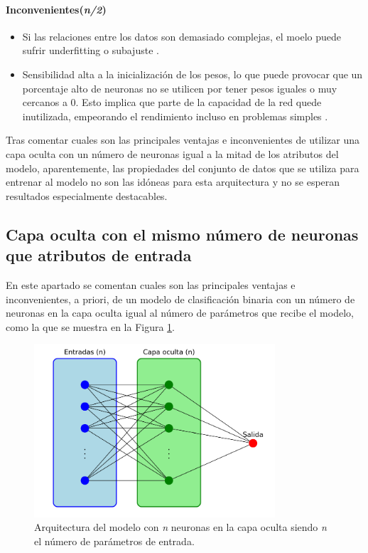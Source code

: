 \paragraph{Inconvenientes(\textit{n/2})}
\begin{itemize}
	\item Si las relaciones entre los datos son demasiado complejas, el moelo puede sufrir underfitting o subajuste \cite{goodfellow2016deep}.
	\item Sensibilidad alta a la inicialización de los pesos, lo que puede provocar que un porcentaje alto de neuronas no se utilicen por tener pesos iguales o muy cercanos a 0. Esto implica que parte de la capacidad de la red quede inutilizada, empeorando el rendimiento incluso en problemas simples \cite{glorot2010understanding}.
\end{itemize}

Tras comentar cuales son las principales ventajas e inconvenientes de utilizar una capa oculta con un número de neuronas igual a la mitad de los atributos del modelo, aparentemente, las propiedades del conjunto de datos que se utiliza para entrenar al modelo no son las idóneas para esta arquitectura y no se esperan resultados especialmente destacables.

\subsection{Capa oculta con el mismo número de neuronas que atributos de entrada}\label{sec:VIBIN49}
En este apartado se comentan cuales son las principales ventajas e inconvenientes, a priori, de un modelo de clasificación binaria con un número de neuronas en la capa oculta igual al número de parámetros que recibe el modelo, como la que se muestra en la Figura \ref{fig:arqnBIN}.

\begin{figure}[H]
    \centering
    \includegraphics[width=0.8\textwidth]{./img/modelo/arquitecturas/arqnBIN.pdf}
    \caption{Arquitectura del modelo con \textit{n} neuronas en la capa oculta siendo \textit{n} el número de parámetros de entrada.}
    \label{fig:arqnBIN}
\end{figure}

